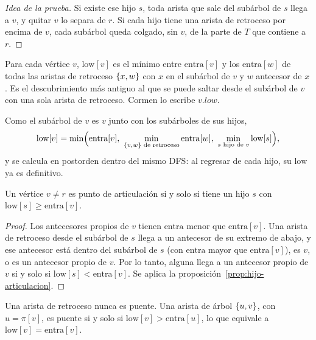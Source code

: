 \documentclass[11pt,letterpaper]{article}
\begin{document}
\begin{proof}[Idea de la prueba]
  Si existe ese hijo $s$, toda arista que sale del subárbol de $s$
  llega a $v$, y quitar $v$ lo separa de $r$. Si cada hijo tiene una
  arista de retroceso por encima de $v$, cada subárbol queda colgado,
  sin $v$, de la parte de $T$ que contiene a $r$.
\end{proof}

\begin{definicion}
  \label{def:low}
  Para cada vértice $v$, $\text{low}[v]$ es el mínimo entre
  $\text{entra}[v]$ y los $\text{entra}[w]$ de todas las aristas de
  retroceso $\left\{ x, w \right\}$ con $x$ en el subárbol de $v$ y $w$ antecesor
  de $x$. Es el descubrimiento más antiguo al que se puede saltar desde
  el subárbol de $v$ con una sola arista de retroceso. Cormen lo
  escribe $v.\mathit{low}$.
\end{definicion}

Como el subárbol de $v$ es $v$ junto con los subárboles de sus hijos,
\[
  \text{low}[v] = \min\Bigl(\text{entra}[v],\
    \min_{\left\{ v, w \right\} \text{ de retroceso}} \text{entra}[w],\
    \min_{s \text{ hijo de } v} \text{low}[s]\Bigr) ,
\]
y se calcula en postorden dentro del mismo DFS: al regresar de cada
hijo, su $\text{low}$ ya es definitivo.

\begin{corolario}
  \label{cor:articulacion-low}
  Un vértice $v \neq r$ es punto de articulación si y solo si tiene un
  hijo $s$ con $\text{low}[s] \ge \text{entra}[v]$.
\end{corolario}

\begin{proof}
  Los antecesores propios de $v$ tienen $\text{entra}$ menor que
  $\text{entra}[v]$. Una arista de retroceso desde el subárbol de $s$
  llega a un antecesor de su extremo de abajo, y ese antecesor está
  dentro del subárbol de $s$ (con $\text{entra}$ mayor que
  $\text{entra}[v]$), es $v$, o es un antecesor propio de $v$. Por lo
  tanto, alguna llega a un antecesor propio de $v$ si y solo si
  $\text{low}[s] < \text{entra}[v]$. Se aplica la
  proposición~\ref{prop:hijo-articulacion}.
\end{proof}

\begin{proposicion}
  \label{prop:puente-low}
  Una arista de retroceso nunca es puente. Una arista de árbol
  $\left\{ u, v \right\}$, con $u = \pi[v]$, es puente si y solo si
  $\text{low}[v] > \text{entra}[u]$, lo que equivale a
  $\text{low}[v] = \text{entra}[v]$.
\end{proposicion}
\end{document}
